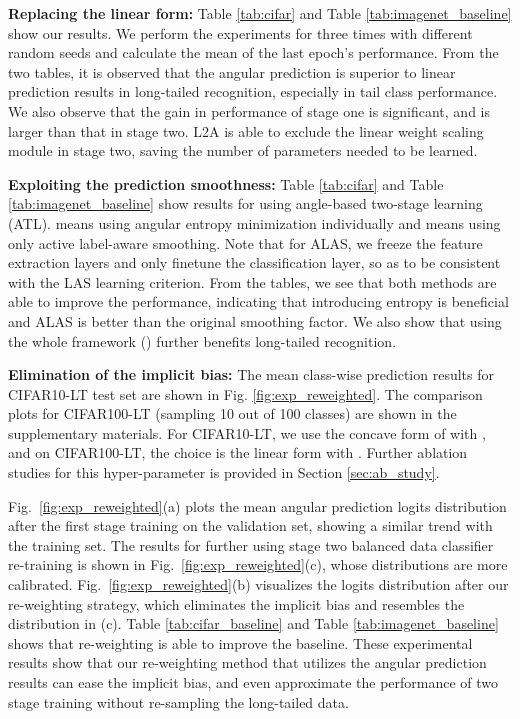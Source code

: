 \documentclass[10pt,twocolumn,letterpaper]{article}
\begin{document}
\textbf{Replacing the linear form:} Table \ref{tab:cifar} and Table \ref{tab:imagenet_baseline} show our results. We perform the experiments for three times with different random seeds and calculate the mean of the last epoch's performance. From the two tables, it is observed that the angular prediction is superior to linear prediction results in long-tailed recognition, especially in tail class performance. We also observe that the gain in performance of stage one is significant, and is larger than that in stage two. L2A is able to exclude the linear weight scaling module in stage two, saving the number of parameters needed to be learned. 

\textbf{Exploiting the prediction smoothness:} Table \ref{tab:cifar} and Table \ref{tab:imagenet_baseline} show results for using angle-based two-stage learning (ATL).  means using angular entropy minimization individually and  means using only active label-aware smoothing. Note that for ALAS, we freeze the feature extraction layers and only finetune the classification layer, so as to be consistent with the LAS learning criterion. From the tables, we see that both methods are able to improve the performance, indicating that introducing entropy is beneficial and ALAS is better than the original smoothing factor. We also show that using the whole framework () further benefits long-tailed recognition.

\textbf{Elimination of the implicit bias:} The mean class-wise prediction results for CIFAR10-LT test set are shown in Fig. \ref{fig:exp_reweighted}. The comparison plots for CIFAR100-LT (sampling 10 out of 100 classes) are shown in the supplementary materials. For CIFAR10-LT, we use the concave form of  with , and on CIFAR100-LT, the choice is the linear form with . Further ablation studies for this hyper-parameter is provided in Section \ref{sec:ab_study}.

Fig.~\ref{fig:exp_reweighted}(a) plots the mean angular prediction logits distribution after the first stage training on the validation set, showing a similar trend with the training set. The results for further using stage two balanced data classifier re-training is shown in Fig.~\ref{fig:exp_reweighted}(c), whose distributions are more calibrated. Fig.~\ref{fig:exp_reweighted}(b) visualizes the logits distribution after our re-weighting strategy, which eliminates the implicit bias and resembles the distribution in (c). Table \ref{tab:cifar_baseline} and Table \ref{tab:imagenet_baseline} shows that re-weighting is able to improve the baseline. These experimental results show that our re-weighting method that utilizes the angular prediction results can ease the implicit bias, and even approximate the performance of two stage training without re-sampling the long-tailed data. 
\end{document}
